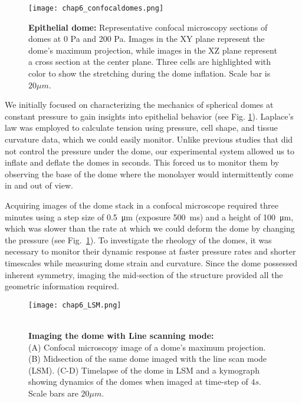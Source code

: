 \begin{figure}[h!]
	\centering
	\texttt{[image: chap6\_confocaldomes.png]}
	\caption{\textbf{Epithelial dome:} Representative confocal microscopy sections of domes at 0 Pa and 200 Pa. Images in the XY plane represent the dome's maximum projection, while images in the XZ plane represent a cross section at the center plane. Three cells are highlighted with color to show the stretching during the dome inflation. Scale bar is $20 \mu m$.
	} \label{fig_6_6}
\end{figure}
\clearpage

We initially focused on characterizing the mechanics of spherical domes at constant pressure to gain insights into epithelial behavior (see Fig. \ref{fig_6_6}). Laplace's law was employed to calculate tension using pressure, cell shape, and tissue curvature data, which we could easily monitor. Unlike previous studies that did not control the pressure under the dome, our experimental system allowed us to inflate and deflate the domes in seconds. This forced us to monitor them by observing the base of the dome where the monolayer would intermittently come in and out of view.

Acquiring images of the dome stack in a confocal microscope required three minutes using a step size of 0.5~\unit{\um} (exposure 500~\unit{\ms}) and a height of 100~\unit{\um}, which was slower than the rate at which we could deform the dome by changing the pressure (see Fig.~\ref{fig_6_6}). To investigate the rheology of the domes, it was necessary to monitor their dynamic response at faster pressure rates and shorter timescales while measuring dome strain and curvature. Since the dome possessed inherent symmetry, imaging the mid-section of the structure provided all the geometric information required.

\begin{figure}[h!]
	\begin{minipage}[c]{0.6\textwidth}
		\texttt{[image: chap6\_LSM.png]}
	\end{minipage}\hfill
	\begin{minipage}[c]{0.35\textwidth}
		\caption{\\ \textbf{Imaging the dome with Line scanning mode:}\\ (A) Confocal microscopy image of a dome's maximum projection. (B) Midsection of the same dome imaged with the line scan mode (LSM). (C-D) Timelapse of the dome in LSM and a kymograph showing dynamics of the domes when imaged at time-step of $4 s$. Scale bars are $20 \mu m$.
		} \label{fig_6_7}
	\end{minipage}
\end{figure}


